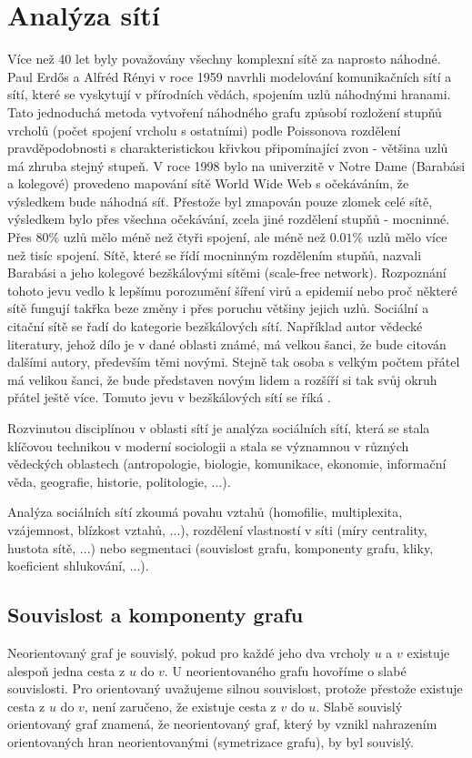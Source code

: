 \documentclass{bakalarka}
\begin{document}


\chapter{Analýza sítí}
Více než 40 let byly považovány všechny komplexní sítě za naprosto náhodné.
Paul Erdős a Alfréd Rényi v roce 1959 navrhli modelování komunikačních sítí a
sítí, které se vyskytují v přírodních vědách, spojením uzlů náhodnými hranami.
Tato jednoduchá metoda vytvoření náhodného grafu způsobí rozložení stupňů
vrcholů (počet spojení vrcholu s ostatními) podle Poissonova rozdělení
pravděpodobnosti s charakteristickou křivkou připomínající zvon - většina uzlů
má zhruba stejný stupeň. 
V roce 1998 bylo na univerzitě v Notre Dame (Barabási a kolegové) provedeno
mapování sítě World Wide Web s očekáváním, že výsledkem bude náhodná síť.
Přestože byl zmapován pouze zlomek celé sítě, výsledkem bylo přes všechna
očekávání, zcela jiné rozdělení stupňů - mocninné. Přes $80\%$ uzlů mělo méně
než čtyři spojení, ale méně než $0.01\%$ uzlů mělo více než tisíc spojení.
Sítě, které se řídí mocninným rozdělením stupňů, nazvali Barabási a jeho kolegové
bezškálovými sítěmi (scale-free network). Rozpoznání tohoto jevu vedlo k
lepšímu porozumění šíření virů a epidemií nebo proč některé sítě fungují takřka
beze změny i přes poruchu většiny jejich uzlů.  Sociální a citační sítě se řadí
do kategorie bezškálových sítí. Například autor vědecké literatury, jehož dílo
je v dané oblasti známé, má velkou šanci, že bude citován dalšími autory,
především těmi novými. Stejně tak osoba s velkým počtem přátel má velikou
šanci, že bude představen novým lidem a rozšíří si tak svůj okruh přátel ještě
více. Tomuto jevu v bezškálových sítí se říká .

Rozvinutou disciplínou v oblasti sítí je analýza sociálních sítí, která se
stala klíčovou technikou v moderní sociologii a stala se významnou v různých
vědeckých oblastech (antropologie, biologie, komunikace, ekonomie, informační
věda, geografie, historie, politologie, ...).

Analýza sociálních sítí zkoumá povahu vztahů (homofilie, multiplexita,
vzájemnost, blízkost vztahů, ...), rozdělení vlastností v síti (míry
centrality, hustota sítě, ...) nebo segmentaci (souvislost grafu, komponenty
grafu, kliky, koeficient shlukování, ...).

\section{Souvislost a komponenty grafu}
Neorientovaný graf je souvislý, pokud pro každé jeho dva vrcholy $u$ a $v$
existuje alespoň jedna cesta z $u$ do $v$. U neorientovaného grafu hovoříme o
slabé souvislosti. Pro orientovaný uvažujeme silnou souvislost, protože
přestože existuje cesta z $u$ do $v$, není zaručeno, že existuje cesta z $v$ do
$u$.  Slabě souvislý orientovaný graf znamená, že neorientovaný graf, který by
vznikl nahrazením orientovaných hran neorientovanými (symetrizace grafu), by
byl souvislý.
\end{document}
